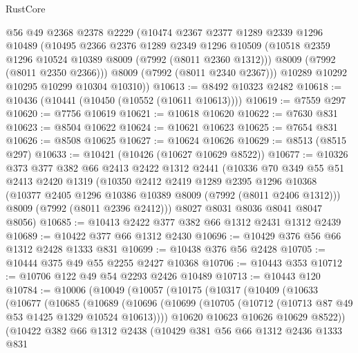 \begin{lexlean}{RustCore}
\begin{coremodule}
        @56
        @49
        @2368
        @2378
        @2229
        (@10474
          @2367
          @2377
          @1289
          @2339
          @1296
          @10489
          (@10495
            @2366
            @2376
            @1289
            @2349
            @1296
            @10509
            (@10518 @2359 @1296 @10524 @10389 @8009 (@7992 (@8011 @2360 @1312)))
            @8009
            (@7992 (@8011 @2350 @2366)))
          @8009
          (@7992 (@8011 @2340 @2367)))
        @10289
        @10292
        @10295
        @10299
        @10304
        @10310))
@10613 := @8492 @10323 @2482
@10618 := @10436 (@10441 (@10450 (@10552 (@10611 @10613))))
@10619 := @7559 @297
@10620 := @7756 @10619
@10621 := @10618 @10620
@10622 := @7630 @831
@10623 := @8504 @10622
@10624 := @10621 @10623
@10625 := @7654 @831
@10626 := @8508 @10625
@10627 := @10624 @10626
@10629 := @8513 (@8515 @297)
@10633 := @10421 (@10426 (@10627 @10629 @8522))
@10677 := @10326
    @373
    @377
    @382
    @66
    @2413
    @2422
    @1312
    @2441
    (@10336
      @70
      @349
      @55
      @51
      @2413
      @2420
      @1319
      (@10350
        @2412
        @2419
        @1289
        @2395
        @1296
        @10368
        (@10377 @2405 @1296 @10386 @10389 @8009 (@7992 (@8011 @2406 @1312)))
        @8009
        (@7992 (@8011 @2396 @2412)))
      @8027
      @8031
      @8036
      @8041
      @8047
      @8056)
@10685 := @10413 @2422 @377 @382 @66 @1312 @2431 @1312 @2439
@10689 := @10422 @377 @66 @1312 @2430
@10696 := @10429 @376 @56 @66 @1312 @2428 @1333 @831
@10699 := @10438 @376 @56 @2428
@10705 := @10444 @375 @49 @55 @2255 @2427 @10368
@10706 := @10443 @353
@10712 := @10706 @122 @49 @54 @2293 @2426 @10489
@10713 := @10443 @120
@10784 := @10006
    (@10049
      (@10057
        (@10175
          (@10317
            (@10409
              (@10633
                (@10677
                  (@10685
                    (@10689
                      (@10696
                        (@10699 (@10705 (@10712 (@10713 @87 @49 @53 @1425 @1329 @10524 @10613))))
                        @10620
                        @10623
                        @10626
                        @10629
                        @8522))
                    (@10422
                      @382
                      @66
                      @1312
                      @2438
                      (@10429
                        @381
                        @56
                        @66
                        @1312
                        @2436
                        @1333
                        @831

\end{coremodule}
\end{lexlean}
